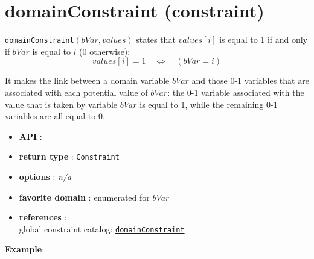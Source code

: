 \label{domainconstraint}
\hypertarget{domainconstraint}{}

\section{domainConstraint (constraint)}\label{domainconstraint:domainconstraintconstraint}\hypertarget{domainconstraint:domainconstraintconstraint}{}
\begin{notedef}  
\texttt{domainConstraint}$(bVar,values)$ states that $values[i]$ is equal to 1 if and only if $bVar$ is equal to $i$ (0 otherwise):
$$values[i]=1\quad\iff\quad (bVar=i)$$ 
\end{notedef}

It makes the link between a domain variable $bVar$ and those 0-1 variables that are associated with each potential value of $bVar$: the 0-1 variable associated with the value that is taken by variable $bVar$ is equal to 1, while the remaining 0-1 variables are all equal to 0.

\begin{itemize}
	\item \textbf{API} : 
	\item \textbf{return type} : \texttt{Constraint}
	\item \textbf{options} : \emph{n/a}
	\item \textbf{favorite domain} : enumerated for $bVar$
	\item \textbf{references} :\\
	  global constraint catalog: \href{http://www.emn.fr/x-info/sdemasse/gccat/Cdomain_constraint.html}{\tt domainConstraint}
\end{itemize}

\textbf{Example}:

